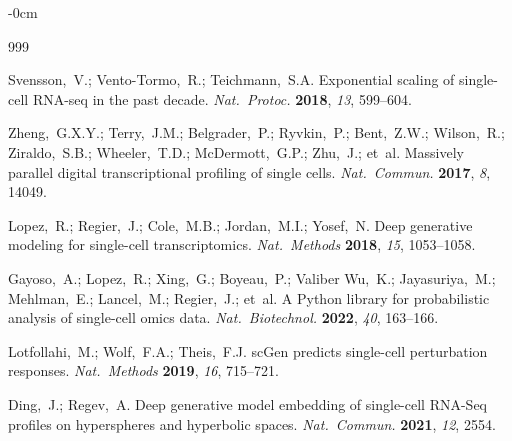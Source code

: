 \documentclass[biology,article,submit,pdftex,moreauthors]{Definitions/mdpi}
\begin{document}
\begin{adjustwidth}{-\extralength}{0cm}



% 


\begin{thebibliography}{999}
\setlength{\itemsep}{0pt}\setlength{\parskip}{0pt}\setlength{\parsep}{0pt}

Svensson,~V.; Vento-Tormo,~R.; Teichmann,~S.A. Exponential scaling of single-cell RNA-seq in the past decade. {\em Nat.\ Protoc.} {\bf 2018}, {\em 13}, 599--604.

Zheng,~G.X.Y.; Terry,~J.M.; Belgrader,~P.; Ryvkin,~P.; Bent,~Z.W.; Wilson,~R.; Ziraldo,~S.B.; Wheeler,~T.D.; McDermott,~G.P.; Zhu,~J.; et~al. Massively parallel digital transcriptional profiling of single cells. {\em Nat.\ Commun.} {\bf 2017}, {\em 8}, 14049.

Lopez,~R.; Regier,~J.; Cole,~M.B.; Jordan,~M.I.; Yosef,~N. Deep generative modeling for single-cell transcriptomics. {\em Nat.\ Methods} {\bf 2018}, {\em 15}, 1053--1058.

Gayoso,~A.; Lopez,~R.; Xing,~G.; Boyeau,~P.; Valiber Wu,~K.; Jayasuriya,~M.; Mehlman,~E.; Lancel,~M.; Regier,~J.; et~al. A Python library for probabilistic analysis of single-cell omics data. {\em Nat.\ Biotechnol.} {\bf 2022}, {\em 40}, 163--166.

Lotfollahi,~M.; Wolf,~F.A.; Theis,~F.J. scGen predicts single-cell perturbation responses. {\em Nat.\ Methods} {\bf 2019}, {\em 16}, 715--721.

Ding,~J.; Regev,~A. Deep generative model embedding of single-cell RNA-Seq profiles on hyperspheres and hyperbolic spaces. {\em Nat.\ Commun.} {\bf 2021}, {\em 12}, 2554.


\end{thebibliography}
\end{adjustwidth}
\end{document}
